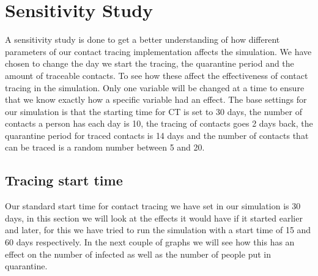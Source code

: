 \section{Sensitivity Study}
A sensitivity study is done to get a better understanding of how different parameters of our contact tracing implementation affects the simulation. We have chosen to change the day we start the tracing, the quarantine period and the amount of traceable contacts. To see how these affect the effectiveness of contact tracing in the simulation. Only one variable will be changed at a time to ensure that we know exactly how a specific variable had an effect.
The base settings for our simulation is that the starting time for CT is set to 30 days, the number of contacts a person has each day is 10, the tracing of contacts goes 2 days back, the quarantine period for traced contacts is 14 days and the number of contacts that can be traced is a random number between 5 and 20. 

\subsection{Tracing start time}
Our standard start time for contact tracing we have set in our simulation is 30 days, in this section we will look at the effects it would have if it started earlier and later, for this we have tried to run the simulation with a start time of 15 and 60 days respectively. In the next couple of graphs we will see how this has an effect on the number of infected as well as the number of people put in quarantine.

